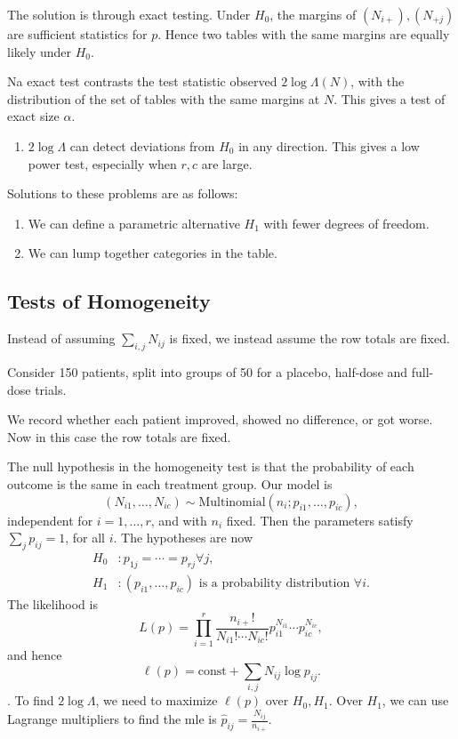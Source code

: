 \documentclass[12pt]{article}
\begin{document}
The solution is through exact testing. Under $H_0$, the margins of $(N_{i+}), (N_{+j})$ are sufficient statistics for $p$. Hence two tables with the same margins are equally likely under $H_0$.

Na exact test contrasts the test statistic observed $2 \log \Lambda(N)$, with the distribution of the set of tables with the same margins at $N$. This gives a test of exact size $\alpha$.

\begin{enumerate}[resume]
	\item $2 \log \Lambda$ can detect deviations from $H_0$ in any direction. This gives a low power test, especially when $r, c$ are large.
\end{enumerate}

Solutions to these problems are as follows:
\begin{enumerate}
	\item We can define a parametric alternative $H_1$ with fewer degrees of freedom.
	\item We can lump together categories in the table.
\end{enumerate}

\subsection{Tests of Homogeneity}
\label{sub:tests_of_homogeneity}

Instead of assuming $\sum_{i,j} N_{ij}$ is fixed, we instead assume the row totals are fixed.

\begin{exbox}
	Consider 150 patients, split into groups of 50 for a placebo, half-dose and full-dose trials.

	We record whether each patient improved, showed no difference, or got worse. Now in this case the row totals are fixed.
\end{exbox}

The null hypothesis in the homogeneity test is that the probability of each outcome is the same in each treatment group. Our model is
\[
	(N_{i1}, \ldots, N_{ic}) \sim \mathrm{Multinomial}(n_i; p_{i1},\ldots,p_{ic}),
\]
independent for $i = 1, \ldots, r$, and with $n_i$ fixed. Then the parameters satisfy $\sum_j p_{ij} = 1$, for all $i$. The hypotheses are now
\begin{align*}
	H_0 &: p_{1j} = \cdots = p_{rj} \forall j,\\
	H_1 &: (p_{i1},\ldots, p_{ic}) \text{ is a probability distribution } \forall i.
\end{align*}
The likelihood is
\[
L(p) = \prod_{i=1}^{r}\frac{n_{i+}!}{N_{i1}!\cdots N_{ic}!} p_{i1}^{N_{i1}}\cdots p_{ic}^{N_{ic}},
\]
and hence
\[
	\ell(p) = \text{const} + \sum_{i,j} N_{ij}\log p_{ij}.
\].
To find $2 \log \Lambda$, we need to maximize $\ell(p)$ over $H_0, H_1$. Over $H_1$, we can use Lagrange multipliers to find the mle is $\hat p_{ij} = \frac{N_{ij}}{n_{i+}}$.
\end{document}
